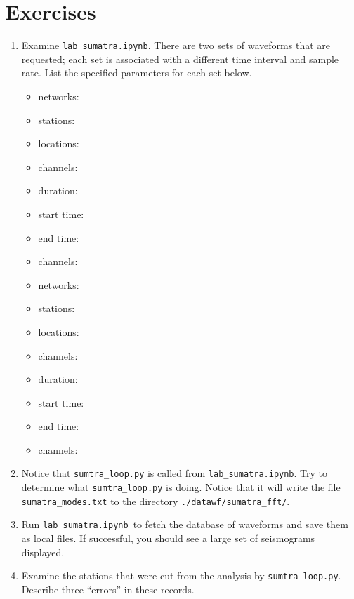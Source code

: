 \documentclass[11pt,titlepage,fleqn]{article}
\newcommand{\tfile}{{\tt lab\_sumatra.ipynb}}
\begin{document}
\section{Exercises}

\begin{enumerate}
\item Examine \tfile. There are two sets of waveforms that are requested; each set is associated with a different time interval and sample rate. List the specified parameters for each set below.

\begin{itemize}
\item networks:
\item stations: 
\item locations: 
\item channels: 
\item duration: 
\item start time: 
\item end time: 
\item channels:
\end{itemize}

\begin{itemize}
\item networks:
\item stations: 
\item locations: 
\item channels: 
\item duration: 
\item start time: 
\item end time: 
\item channels:
\end{itemize}

\item Notice that \verb+sumtra_loop.py+ is called from \tfile. Try to determine what \verb+sumtra_loop.py+ is doing. Notice that it will write the file \verb+sumatra_modes.txt+ to the directory \verb+./datawf/sumatra_fft/+.


\item Run \tfile\ to fetch the database of waveforms and save them as local files. If successful, you should see a large set of seismograms displayed.

\item Examine the stations that were cut from the analysis by \verb+sumtra_loop.py+. Describe three ``errors'' in these records.


\end{enumerate}
\end{document}
